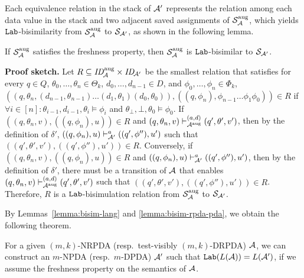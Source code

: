 %
Each equivalence relation in the stack of ${\cal A}'$ represents
the relation among each data value in the stack and
two adjacent saved assignments
of ${\cal S}_{{\cal A}}^{\mathrm{aug}}$,
which yields $\mathtt{Lab}$-bisimilarity from
${\cal S}_{{\cal A}}^{\mathrm{aug}}$ to ${\cal S}_{{\cal A}'}$,
as shown in the following lemma.
%
\begin{lemma}\label{lemma:bisim-rpda-pda}
If ${\cal S}_{{\cal A}}^{\mathrm{aug}}$ satisfies the freshness property, then
${\cal S}_{{\cal A}}^{\mathrm{aug}}$ is $\mathtt{Lab}$-bisimilar to
${\cal S}_{{\cal A}'}$.
\end{lemma}
%
{\bf Proof sketch.}\quad
Let $R\subseteq \mathit{ID}_{\!{\cal A}}^{\mathrm{aug}}\times\mathit{ID}_{\!{\cal A}'}$
be the smallest relation
that satisfies
for every $q\in Q$, $\theta_0,\ldots,\theta_n\in\Theta_k$,
$d_0,\ldots,d_{n-1}\in D$, and $\phi_0,\ldots,\phi_n\in\Phi_k$,
$((q,\theta_n,(d_{n-1},\theta_{n-1})\allowbreak\ldots\allowbreak
(d_1,\theta_1)(d_0,\theta_0)),
((q,\phi_n),\phi_{n-1}\ldots\phi_1\phi_0))\in R$
if
$\forall i\in[n]: \theta_{i-1},d_{i-1},\theta_i\models\phi_i$ and
$\theta_{\bot},{\bot},\theta_0\models\phi_0$.
%
If
$((q,\theta_n,v), ((q,\phi_n),u))\in R$ and
$(q,\theta_n,v)\vdash_{{\cal A}^{\mathrm{aug}}}^{(a,d)}(q',\theta',v')$,
then by the definition of $\delta'$,
$((q,\phi_n),u)\vdash_{{\cal A}'}^a ((q',\phi''),u')$
such that $((q',\theta',v'), ((q',\phi''),u'))\in R$.
Conversely, if
$((q,\theta_n,v),\allowbreak ((q,\phi_n),u))\in R$ and
$((q,\phi_n),u)\vdash_{{\cal A}'}^a ((q',\phi''),u')$,
then by the definition of $\delta'$,
there must be a transition of ${\cal A}$ that enables
$(q,\theta_n,v)\vdash_{{\cal A}^{\mathrm{aug}}}^{(a,d)} (q',\theta',v')$
such that $((q',\theta',v'), ((q',\phi''),u'))\in R$.
%
Therefore, $R$ is a $\mathtt{Lab}$-bisimulation relation from
${\cal S}_{{\cal A}}^{\mathrm{aug}}$ to ${\cal S}_{{\cal A}'}$.

\smallskip

By Lemmas~\ref{lemma:bisim-lang} and \ref{lemma:bisim-rpda-pda},
we obtain the following theorem.
\begin{theorem}
\label{the: RPDAtoPDA}
For a given $(m,k)$-NRPDA (resp.\ test-visibly $(m,k)$-DRPDA) ${\cal A}$,
we can construct an $m$-NPDA (resp.\ $m$-DPDA) ${\cal A}'$
such that $\mathtt{Lab}(L({\cal A}))=L({\cal A}')$,
if we assume the freshness property on the semantics of ${\cal A}$.
\end{theorem}

